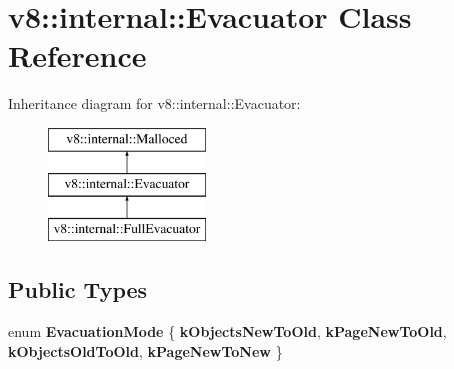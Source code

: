 \hypertarget{classv8_1_1internal_1_1Evacuator}{}\section{v8\+:\+:internal\+:\+:Evacuator Class Reference}
\label{classv8_1_1internal_1_1Evacuator}
Inheritance diagram for v8\+:\+:internal\+:\+:Evacuator\+:\begin{figure}[H]
\begin{center}
\leavevmode
\includegraphics[height=3.000000cm]{classv8_1_1internal_1_1Evacuator}
\end{center}
\end{figure}
\subsection*{Public Types}
\begin{DoxyCompactItemize}
\item 
\mbox{\label{classv8_1_1internal_1_1Evacuator_a314fa42d39b9fa20e11342a5337383ef}} 
enum {\bfseries Evacuation\+Mode} \{ {\bfseries k\+Objects\+New\+To\+Old}, 
{\bfseries k\+Page\+New\+To\+Old}, 
{\bfseries k\+Objects\+Old\+To\+Old}, 
{\bfseries k\+Page\+New\+To\+New}
 \}
\end{DoxyCompactItemize}
